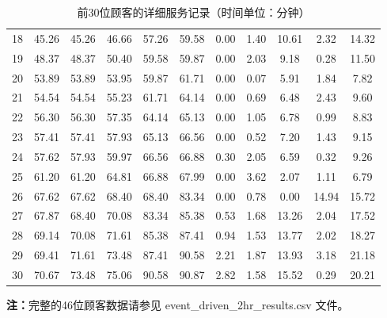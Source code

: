 \documentclass[12pt, a4paper]{article}
\begin{document}
\begin{table}[h]
\begin{tabular}{ccccccccccc}
18 & 45.26 & 45.26 & 46.66 & 57.26 & 59.58 & 0.00 & 1.40 & 10.61 & 2.32 & 14.32 \\
19 & 48.37 & 48.37 & 50.40 & 59.58 & 59.87 & 0.00 & 2.03 & 9.18 & 0.28 & 11.50 \\
20 & 53.89 & 53.89 & 53.95 & 59.87 & 61.71 & 0.00 & 0.07 & 5.91 & 1.84 & 7.82 \\
21 & 54.54 & 54.54 & 55.23 & 61.71 & 64.14 & 0.00 & 0.69 & 6.48 & 2.43 & 9.60 \\
22 & 56.30 & 56.30 & 57.35 & 64.14 & 65.13 & 0.00 & 1.05 & 6.78 & 0.99 & 8.83 \\
23 & 57.41 & 57.41 & 57.93 & 65.13 & 66.56 & 0.00 & 0.52 & 7.20 & 1.43 & 9.15 \\
24 & 57.62 & 57.93 & 59.97 & 66.56 & 66.88 & 0.30 & 2.05 & 6.59 & 0.32 & 9.26 \\
25 & 61.20 & 61.20 & 64.81 & 66.88 & 67.99 & 0.00 & 3.62 & 2.07 & 1.11 & 6.79 \\
26 & 67.62 & 67.62 & 68.40 & 68.40 & 83.34 & 0.00 & 0.78 & 0.00 & 14.94 & 15.72 \\
27 & 67.87 & 68.40 & 70.08 & 83.34 & 85.38 & 0.53 & 1.68 & 13.26 & 2.04 & 17.52 \\
28 & 69.14 & 70.08 & 71.61 & 85.38 & 87.41 & 0.94 & 1.53 & 13.77 & 2.02 & 18.27 \\
29 & 69.41 & 71.61 & 73.48 & 87.41 & 90.58 & 2.21 & 1.87 & 13.93 & 3.18 & 21.18 \\
30 & 70.67 & 73.48 & 75.06 & 90.58 & 90.87 & 2.82 & 1.58 & 15.52 & 0.29 & 20.21 \\
\bottomrule
\end{tabular}
\caption{前30位顾客的详细服务记录（时间单位：分钟）}
\end{table}

\textbf{注：}完整的46位顾客数据请参见 event\_driven\_2hr\_results.csv 文件。
\end{document}
